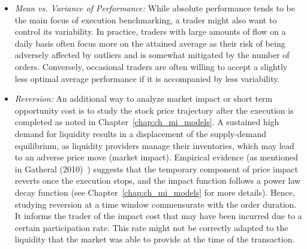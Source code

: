 \begin{itemize}
\item \emph{Mean vs. Variance of Performance:} While absolute performance tends to be the main focus of execution benchmarking, a trader might also want to control its variability. In practice, traders with large amounts of flow on a daily basis often focus more on the attained average as their risk of being adversely affected by outliers and is somewhat mitigated by the number of orders. Conversely, occasional traders are often willing to accept a slightly less optimal average performance if it is accompanied by less variability.

\item \emph{Reversion:} An additional way to analyze market impact or short term opportunity cost is to study the stock price trajectory after the execution is completed as noted in Chapter~\ref{chap:ch_mi_models}. A sustained high demand for liquidity results in a displacement of the supply-demand equilibrium, as liquidity providers manage their inventories, which may lead to an adverse price move (market impact). Empirical evidence (as mentioned in Gatheral (2010)~\cite{gatheral}) suggests that the temporary component of price impact reverts once the execution stops, and the impact function follows a power law decay function (see Chapter~\ref{chap:ch_mi_models} for more details). Hence, studying reversion at a time window commensurate with the order duration. It informs the trader of the impact cost that may have been incurred due to a certain participation rate. This rate might not be correctly adapted to the liquidity that the market was able to provide at the time of the transaction.



\end{itemize}
